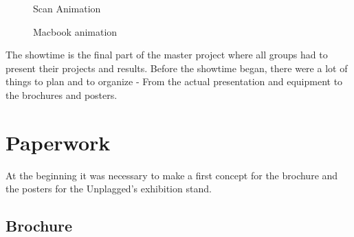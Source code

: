 \begin{figure}[!hbtp]
  \centering
  \caption{Scan Animation}
  \label{fig:scan-animation}
\end{figure}

\begin{figure}[!hbtp]
  \centering
  \caption{Macbook animation}
  \label{fig:macbook}
\end{figure}

\pagebreak 


The showtime is the final part of the master project where all groups had to present their projects and results.
Before the showtime began, there were a lot of things to plan and to organize - From the actual presentation and equipment to the brochures and posters. 


\section{Paperwork}
At the beginning it was necessary to make a first concept for the brochure and the posters for the Unplagged's exhibition stand.

\pagebreak

\subsection{Brochure}


